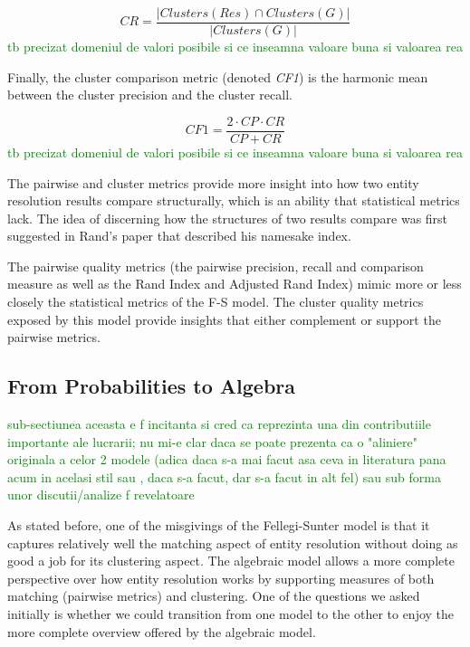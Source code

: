 \documentclass[journal]{IEEEtran}
\begin{document}
    \[
        CR = \frac{|Clusters(Res) \cap Clusters(G)|}{|Clusters(G)|}
    \]
    \textcolor{green}{tb precizat domeniul de valori posibile si ce inseamna valoare buna si valoarea rea}

    Finally, the cluster comparison metric (denoted \textit{CF1}) is the
    harmonic mean between the cluster precision and the cluster recall.

    \[
        CF1 = \frac{2 \cdot CP \cdot CR}{CP + CR}
    \]
    \textcolor{green}{tb precizat domeniul de valori posibile si ce inseamna valoare buna si valoarea rea}

    The pairwise and cluster metrics provide more insight into how two entity
    resolution results compare structurally, which is an ability that statistical
    metrics lack.
    The idea of discerning how the structures of two results compare was first
    suggested in Rand's paper that described his namesake index\cite{rand1971}.
    
    The pairwise quality metrics (the pairwise precision, recall and
    comparison measure as well as the Rand Index and Adjusted Rand Index) mimic
    more or less closely the statistical metrics of the F-S model.
    The cluster quality metrics exposed by this model provide insights that
    either complement or support the pairwise metrics.
    

    \subsection{From Probabilities to Algebra}\label{subsec:fsm-alg}

    \textcolor{green}{sub-sectiunea aceasta e f incitanta si cred ca reprezinta una din contributiile importante ale lucrarii; nu mi-e clar daca se poate prezenta ca o "aliniere" originala a celor 2 modele (adica daca s-a mai facut asa ceva in literatura pana acum in acelasi stil sau , daca s-a facut, dar s-a facut in alt fel) sau sub forma unor discutii/analize f revelatoare}
    
    As stated before, one of the misgivings of the Fellegi-Sunter model is that
    it captures relatively well the matching aspect of entity resolution without
    doing as good a job for its clustering aspect.
    The algebraic model allows a more complete perspective over how entity
    resolution works by supporting measures of both matching (pairwise metrics)
    and clustering.
    One of the questions we asked initially is whether we could transition from
    one model to the other to enjoy the more complete overview offered by the
    algebraic model.
\end{document}

